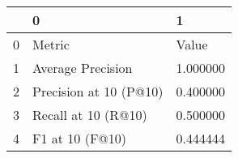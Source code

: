 \begin{tabular}{lll}
\toprule
 & 0 & 1 \\
\midrule
0 & Metric & Value \\
1 & Average Precision & 1.000000 \\
2 & Precision at 10 (P@10) & 0.400000 \\
3 & Recall at 10 (R@10) & 0.500000 \\
4 & F1 at 10 (F@10) & 0.444444 \\
\bottomrule
\end{tabular}
